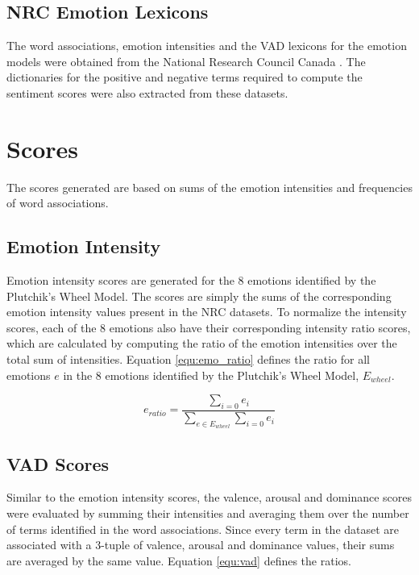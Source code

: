 \documentclass[11pt]{article}
\begin{document}
\subsection{NRC Emotion Lexicons}

The word associations, emotion intensities and the VAD lexicons for the emotion models were obtained from the National Research Council Canada \cite{LREC18-AIL,Mohammad13,vad-acl2018}. The dictionaries for the positive and negative terms required to compute the sentiment scores were also extracted from these datasets.

\clearpage
\newpage
\section{Scores}

The scores generated are based on sums of the emotion intensities and frequencies of word associations.

\subsection{Emotion Intensity}

Emotion intensity scores are generated for the 8 emotions identified by the Plutchik's Wheel Model. The scores are simply the sums of the corresponding emotion intensity values present in the NRC datasets. To normalize the intensity scores, each of the 8 emotions also have their corresponding intensity ratio scores, which are calculated by computing the ratio of the emotion intensities over the total sum of intensities. Equation \ref{equ:emo_ratio} defines the ratio for all emotions $e$ in the 8 emotions identified by the Plutchik's Wheel Model, $E_{wheel}$.

\begin{equation} \label{equ:emo_ratio}
  e_{ratio} = \frac{\sum_{i=0}e_i}{\sum_{e \in E_{wheel}}\sum_{i=0}e_i}
\end{equation}

\subsection{VAD Scores}

Similar to the emotion intensity scores, the valence, arousal and dominance scores were evaluated by summing their intensities and averaging them over the number of terms identified in the word associations. Since every term in the dataset are associated with a 3-tuple of valence, arousal and dominance values, their sums are averaged by the same value. Equation \ref{equ:vad} defines the ratios.
\end{document}
